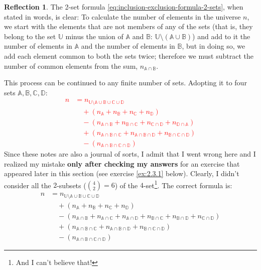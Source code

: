 \documentclass[11pt]{book}
\theoremstyle{definition}
\theoremstyle{plain}
\theoremstyle{definition}
\theoremstyle{problemstyle}
\theoremstyle{remark}
\theoremstyle{definition}
\newtheorem{reflection}{Reflection}
\begin{document}
\begin{reflection}
    The 2-set formula \ref{eq:inclusion-exclusion-formula-2-sets}, when stated in words, is clear: To calculate the number of elements in the universe $n$, we start with the elements that are not members of any of the sets (that is, they belong to the set $\mathbb{U}$ minus the union of $\mathbb{A}$ and $\mathbb{B}$: $\mathbb{U}\setminus(\mathbb{A}\cup\mathbb{B})$) and add to it the number of elements in $\mathbb{A}$ and the number of elements in $\mathbb{B}$, but in doing so, we add each element common to both the sets twice; therefore we must subtract the number of common elements from the sum, $n_{\mathbb{A}\cap\mathbb{B}}$.

    This process can be continued to any finite number of sets. Adopting it to four sets $\mathbb{A,B,C,D}$:
    \textcolor{red}{
    \begin{equation}
        \begin{aligned}
        n&=n_{\mathbb{U}\setminus{\mathbb{A}\cup\mathbb{B}\cup\mathbb{C}}\cup\mathbb{D}}\\
         &\quad+(n_{\mathbb{A}}+n_{\mathbb{B}}+n_{\mathbb{C}}+n_{\mathbb{D}})\\
         &\quad-(n_{\mathbb{A}\cap\mathbb{B}}+n_{\mathbb{B}\cap\mathbb{C}}+n_{\mathbb{C}\cap\mathbb{D}}+n_{\mathbb{D}\cap\mathbb{A}})\\
         &\quad+(n_{\mathbb{A}\cap\mathbb{B}\cap\mathbb{C}}+n_{\mathbb{A}\cap\mathbb{B}\cap\mathbb{D}}+n_{\mathbb{B}\cap\mathbb{C}\cap\mathbb{D}})\\
         &\quad-(n_{\mathbb{A}\cap\mathbb{B}\cap\mathbb{C}\cap\mathbb{D}})
        \end{aligned}
            \tag{wrong-n-2-subsets}
        \label{eq:inclusion-exclusion-formula-4-sets-wrong}
    \end{equation}
     }
     Since these notes are also a journal of sorts, I admit that I went wrong here and I realized my mistake \textbf{only after checking my answers} for an exercise that appeared later in this section (see exercise \ref{ex:2.3.1} below). Clearly, I didn't consider all the $2$-subsets ($\binom{4}{2}=6$) of the $4$-set\footnote{And I can't believe that!}. The correct formula is: 
    \begin{equation}
        \begin{aligned}
        n&=n_{\mathbb{U}\setminus{\mathbb{A}\cup\mathbb{B}\cup\mathbb{C}}\cup\mathbb{D}}\\
         &\quad+(n_{\mathbb{A}}+n_{\mathbb{B}}+n_{\mathbb{C}}+n_{\mathbb{D}})\\
            &\quad-(n_{\mathbb{A}\cap\mathbb{B}}+n_{\mathbb{A}\cap\mathbb{C}}+n_{\mathbb{A}\cap\mathbb{D}}+n_{\mathbb{B}\cap\mathbb{C}}+n_{\mathbb{B}\cap\mathbb{D}}+n_{\mathbb{C}\cap\mathbb{D}})\\
         &\quad+(n_{\mathbb{A}\cap\mathbb{B}\cap\mathbb{C}}+n_{\mathbb{A}\cap\mathbb{B}\cap\mathbb{D}}+n_{\mathbb{B}\cap\mathbb{C}\cap\mathbb{D}})\\
         &\quad-(n_{\mathbb{A}\cap\mathbb{B}\cap\mathbb{C}\cap\mathbb{D}})
        \end{aligned}
        \label{eq:inclusion-exclusion-formula-4-sets}
    \end{equation}
\end{reflection}
\end{document}
